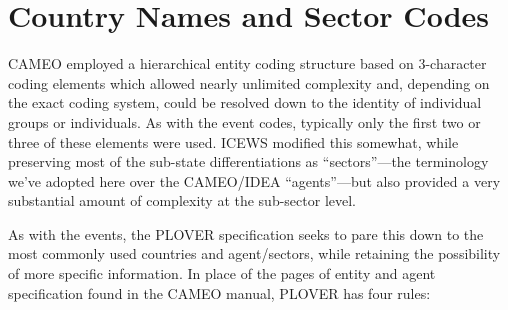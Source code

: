 \documentclass[11pt]{report}
\begin{document}

\chapter{Country Names and Sector Codes}

CAMEO employed a hierarchical entity coding structure based on 3-character coding elements which allowed nearly unlimited complexity and, depending on the exact coding system, could be resolved down to the identity of individual groups or individuals. As with the event codes, typically only the first two or three of these elements were used. ICEWS modified this somewhat, while preserving most of the sub-state differentiations as ``sectors''---the terminology we've adopted here over the CAMEO/IDEA ``agents''---but also provided a very substantial amount of complexity at the sub-sector level.

As with the events, the PLOVER specification seeks to pare this down to the most commonly used countries and agent/sectors, while retaining the possibility of more specific information. In place of the pages of entity and agent specification found in the CAMEO manual, PLOVER has four rules:
\end{document}
